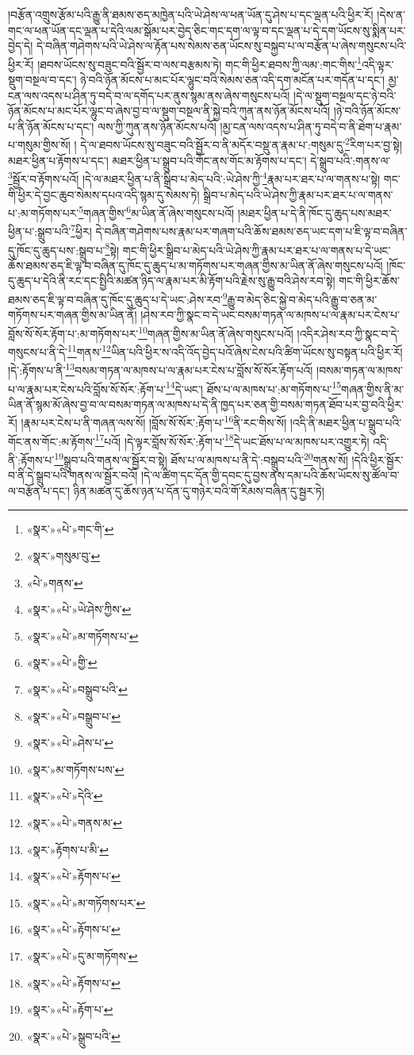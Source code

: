།བརྩོན་འགྲུས་རྩོམ་པའི་རྒྱུ་ནི་ཐམས་ཅད་མཁྱེན་པའི་ཡེ་ཤེས་ལ་ཕན་ཡོན་དུ་ཤེས་པ་དང་ལྡན་པའི་ཕྱིར་རོ། །དེས་ན་གང་ལ་ཕན་ཡོན་དང་ལྡན་པ་དེའི་ལམ་སྒོམ་པར་བྱེད་ཅིང་གང་དག་ལ་ལྟ་བ་དང་ལྡན་པ་དེ་དག་ཡོངས་སུ་སྨིན་པར་བྱེད་དེ། དེ་བཞིན་གཤེགས་པའི་ཡེ་ཤེས་ལ་རྟོན་པས་སེམས་ཅན་ཡོངས་སུ་བསྐྱབ་པ་ལ་བརྩོན་པ་ཞེས་གསུངས་པའི་ཕྱིར་རོ། །ཐབས་ཡོངས་སུ་བཟུང་བའི་སྦྱོར་བ་ལས་བརྩམས་ཏེ། གང་གི་ཕྱིར་ཐབས་ཀྱི་ལམ་:གང་གིས་\footnote{«སྣར་»«པེ་»གང་གི་}འདི་ལྟར་སྡུག་བསྔལ་བ་དང་། ཉེ་བའི་ཉོན་མོངས་པ་མང་པོར་ལྷུང་བའི་སེམས་ཅན་འདི་དག་མངོན་པར་གདོན་པ་དང་། མྱ་ངན་ལས་འདས་པ་ཤིན་ཏུ་བདེ་བ་ལ་དགོད་པར་ནུས་སྙམ་ནས་ཞེས་གསུངས་པའོ། །དེ་ལ་སྡུག་བསྔལ་དང་ཉེ་བའི་ཉོན་མོངས་པ་མང་པོར་ལྷུང་བ་ཞེས་བྱ་བ་ལ་སྡུག་བསྔལ་ནི་སྐྱེ་བའི་ཀུན་ནས་ཉོན་མོངས་པའོ། །ཉེ་བའི་ཉོན་མོངས་པ་ནི་ཉོན་མོངས་པ་དང་། ལས་ཀྱི་ཀུན་ནས་ཉོན་མོངས་པའོ། །མྱ་ངན་ལས་འདས་པ་ཤིན་ཏུ་བདེ་བ་ནི་ཐེག་པ་རྣམ་པ་གསུམ་གྱིས་སོ། །
དེ་ལ་ཐབས་ཡོངས་སུ་བཟུང་བའི་སྦྱོར་བ་ནི་མདོར་བསྡུ་ན་རྣམ་པ་:གསུམ་དུ་\footnote{«སྣར་»གསུམ་བུ་}རིག་པར་བྱ་སྟེ། མཐར་ཕྱིན་པ་རྟོགས་པ་དང་། མཐར་ཕྱིན་པ་སྒྲུབ་པའི་གོང་ནས་གོང་མ་རྟོགས་པ་དང་། དེ་སྒྲུབ་པའི་:གནས་ལ་\footnote{«པེ་»གནས་}སྦྱོར་བ་རྟོགས་པའོ། །དེ་ལ་མཐར་ཕྱིན་པ་ནི་སྒྲིབ་པ་མེད་པའི་:ཡེ་ཤེས་ཀྱི་\footnote{«སྣར་»«པེ་»ཡེ་ཤེས་ཀྱིས་}རྣམ་པར་ཐར་པ་ལ་གནས་པ་སྟེ། གང་གི་ཕྱིར་དེ་བྱང་ཆུབ་སེམས་དཔའ་འདི་སྙམ་དུ་སེམས་ཏེ། སྒྲིབ་པ་མེད་པའི་ཡེ་ཤེས་ཀྱི་རྣམ་པར་ཐར་པ་ལ་གནས་པ་:མ་གཏོགས་པར་\footnote{«སྣར་»«པེ་»མ་གཏོགས་པ་}གཞན་གྱིས་\footnote{«སྣར་»«པེ་»གྱི་}མ་ཡིན་ནོ་ཞེས་གསུངས་པའོ། །མཐར་ཕྱིན་པ་དེ་ནི་ཁོང་དུ་ཆུད་པས་མཐར་ཕྱིན་པ་:སྒྲུབ་པའི་\footnote{«སྣར་»«པེ་»བསྒྲུབ་པའི་}ཕྱིར། དེ་བཞིན་གཤེགས་པས་རྣམ་པར་གཞག་པའི་ཆོས་ཐམས་ཅད་ཡང་དག་པ་ཇི་ལྟ་བ་བཞིན་དུ་ཁོང་དུ་ཆུད་པས་:སྒྲུབ་པ་\footnote{«སྣར་»«པེ་»བསྒྲུབ་པ་}སྟེ། གང་གི་ཕྱིར་སྒྲིབ་པ་མེད་པའི་ཡེ་ཤེས་ཀྱི་རྣམ་པར་ཐར་པ་ལ་གནས་པ་དེ་ཡང་ཆོས་ཐམས་ཅད་ཇི་ལྟ་བ་བཞིན་དུ་ཁོང་དུ་ཆུད་པ་མ་གཏོགས་པར་གཞན་གྱིས་མ་ཡིན་ནོ་ཞེས་གསུངས་པའོ། །ཁོང་དུ་ཆུད་པ་དེའི་ནི་རང་དང་སྤྱིའི་མཚན་ཉིད་ལ་རྣམ་པར་མི་རྟོག་པའི་རྗེས་སུ་རྒྱུ་བའི་ཤེས་རབ་སྟེ། གང་གི་ཕྱིར་ཆོས་ཐམས་ཅད་ཇི་ལྟ་བ་བཞིན་དུ་ཁོང་དུ་ཆུད་པ་དེ་ཡང་:ཤེས་རབ་\footnote{«སྣར་»«པེ་»ཤེས་པ་}རྒྱུ་བ་མེད་ཅིང་སྐྱེ་བ་མེད་པའི་རྒྱུ་བ་ཅན་མ་གཏོགས་པར་གཞན་གྱིས་མ་ཡིན་ནོ། །ཤེས་རབ་ཀྱི་སྣང་བ་དེ་ཡང་བསམ་གཏན་ལ་མཁས་པ་ལ་རྣམ་པར་ངེས་པ་བློས་སོ་སོར་རྟོག་པ་:མ་གཏོགས་པར་\footnote{«སྣར་»མ་གཏོགས་པས་}གཞན་གྱིས་མ་ཡིན་ནོ་ཞེས་གསུངས་པའོ། །འདིར་ཤེས་རབ་ཀྱི་སྣང་བ་དེ་གསུངས་པ་ནི་དེ་\footnote{«སྣར་»«པེ་»དེའི་}གནས་\footnote{«སྣར་»«པེ་»གནས་མ་}ཡིན་པའི་ཕྱིར་ས་འདི་འོད་བྱེད་པའོ་ཞེས་ངེས་པའི་ཚིག་ཡོངས་སུ་བསྟན་པའི་ཕྱིར་རོ། །དེ་:རྟོགས་པ་ནི་\footnote{«སྣར་»རྟོགས་པ་མི་}བསམ་གཏན་ལ་མཁས་པ་ལ་རྣམ་པར་ངེས་པ་བློས་སོ་སོར་རྟོག་པའོ། །བསམ་གཏན་ལ་མཁས་པ་ལ་རྣམ་པར་ངེས་པའི་བློས་སོ་སོར་:རྟོག་པ་\footnote{«སྣར་»«པེ་»རྟོགས་པ་}དེ་ཡང་། ཐོས་པ་ལ་མཁས་པ་:མ་གཏོགས་པ་\footnote{«སྣར་»«པེ་»མ་གཏོགས་པར་}གཞན་གྱིས་ནི་མ་ཡིན་ནོ་སྙམ་མོ་ཞེས་བྱ་བ་ལ་བསམ་གཏན་ལ་མཁས་པ་དེ་ནི་ཁྱད་པར་ཅན་གྱི་བསམ་གཏན་ཐོབ་པར་བྱ་བའི་ཕྱིར་རོ། །རྣམ་པར་ངེས་པ་ནི་གཞན་ལས་སོ། །བློས་སོ་སོར་:རྟོག་པ་\footnote{«སྣར་»«པེ་»རྟོགས་པ་}ནི་རང་གིས་སོ། །འདི་ནི་མཐར་ཕྱིན་པ་སྒྲུབ་པའི་གོང་ནས་གོང་:མ་རྟོགས་\footnote{«སྣར་»«པེ་»དུ་མ་གཏོགས་}པའོ། །དེ་ལྟར་བློས་སོ་སོར་:རྟོག་པ་\footnote{«སྣར་»«པེ་»རྟོགས་པ་}དེ་ཡང་ཐོས་པ་ལ་མཁས་པར་འགྱུར་ཏེ། འདི་ནི་:རྟོགས་པ་\footnote{«སྣར་»«པེ་»རྟོག་པ་}སྒྲུབ་པའི་གནས་ལ་སྦྱོར་བ་སྟེ། ཐོས་པ་ལ་མཁས་པ་ནི་དེ་:བསྒྲུབ་པའི་\footnote{«སྣར་»«པེ་»སྒྲུབ་པའི་}གནས་སོ། །དེའི་ཕྱིར་སྦྱོར་བ་ནི་དེ་སྒྲུབ་པའི་གནས་ལ་སྦྱོར་བའོ། །དེ་ལ་ཚིག་དང་དོན་གྱི་དབང་དུ་བྱས་ནས་དམ་པའི་ཆོས་ཡོངས་སུ་ཚོལ་བ་ལ་བརྩོན་པ་དང་། ཉིན་མཚན་དུ་ཆོས་ཉན་པ་དོན་དུ་གཉེར་བའི་གོ་རིམས་བཞིན་དུ་སྦྱར་ཏེ། 